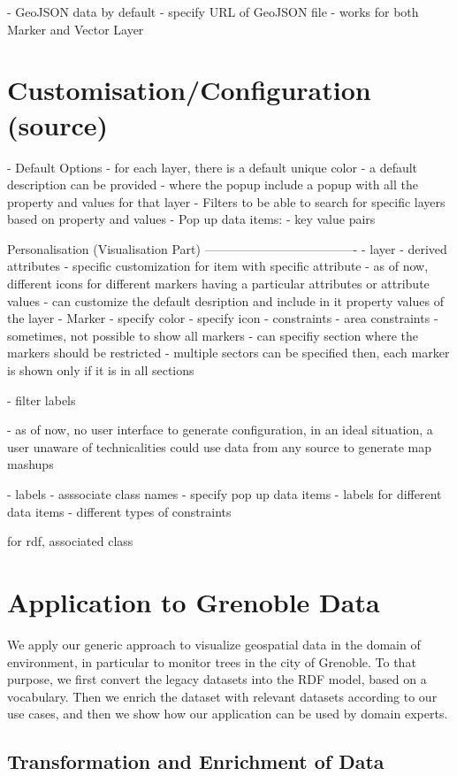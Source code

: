 \documentclass[a4paper,pagenum,english]{rnti}
\begin{document}
{	- GeoJSON data by default
		- specify URL of GeoJSON file
		- works for both Marker and Vector Layer


\section{Customisation/Configuration (source)}\label{section:customisation}
- Default Options
	- for each layer, there is a default unique color
	- a default description can be provided
		- where the popup include a popup with all the property and values for that layer
	- Filters to be able to search for specific layers based on property and values
- Pop up data items:
	- key value pairs
	
	
Personalisation (Visualisation Part)
-------------------------------------
	- layer
		- derived attributes
		- specific customization for item with specific attribute
			- as of now, different icons for different markers having a particular attributes or attribute values
		- can customize the default desription and include in it property values of the layer
	- Marker
		- specify color
		- specify icon
	- constraints
		- area constraints
			- sometimes, not possible to show all markers
			- can specifiy section where the markers should be restricted
			- multiple sectors can be specified then, each marker is shown only if it is in all sections

	- filter labels

- as of now, no user interface to generate configuration, in an ideal situation, a user unaware of technicalities could use data from any source to generate map mashups


- labels 
- asssociate class names
- specify pop up data items
	- labels for different data items
- different types of constraints

for rdf, associated class


\section{Application to Grenoble Data}\label{section:customisation}
We apply our generic approach to visualize geospatial data in the domain of environment, in particular to monitor trees in the city of Grenoble. To that purpose, we first convert the legacy datasets into the RDF model, based on a vocabulary. Then we enrich the dataset with relevant datasets according to our use cases, and then we show how our application can be used by domain experts.

\subsection{Transformation and Enrichment of Data}

}
\end{document}
